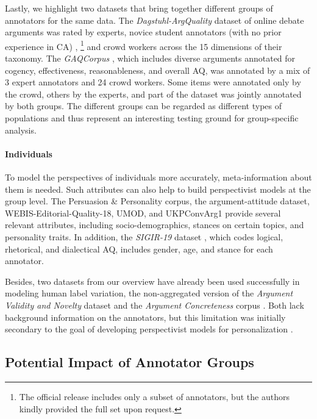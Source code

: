 Lastly, we highlight two datasets that bring together different groups of annotators for the same data. The \textit{Dagstuhl-ArgQuality} dataset \cite{wachsmuth-etal-2017-computational} of online debate arguments was rated by experts, novice student annotators (with no prior experience in CA) \cite{mirzakhmedova2024reliable},%
\footnote{The official release includes only a subset of annotators, but the authors kindly provided the full set upon request.} 
and crowd workers \cite{wachsmuth-etal-2017-argumentation} across the 15 dimensions of their taxonomy. The \textit{GAQCorpus} \cite{lauscher-etal-2020-rhetoric}, which includes diverse arguments annotated for cogency, effectiveness, reasonableness, and overall AQ, was annotated by a mix of 3 expert annotators and 24 crowd workers. Some items were annotated only by the crowd, others by the experts, and part of the dataset was jointly annotated by both groups. The different groups can be regarded as different types of populations and thus represent an interesting testing ground for group-specific analysis.

\paragraph{Individuals}

To model the perspectives of individuals more accurately, meta-information about them is needed. Such attributes can also help to build perspectivist models at the group level. The Persuasion \& Personality corpus, the argument-attitude dataset, WEBIS-Editorial-Quality-18, UMOD, and UKPConvArg1 provide several relevant attributes, including socio-demographics, stances on certain topics, and personality traits. In addition, the \textit{SIGIR-19} dataset \cite{potthast2019argument}, which codes logical, rhetorical, and dialectical AQ, includes gender, age, and stance for each annotator.

Besides, two datasets from our overview have already been used successfully in modeling human label variation, the non-aggregated version of the \textit{Argument Validity and Novelty} dataset \cite{heinisch-etal-2023-architectural} and the \textit{Argument Concreteness} corpus \cite{romberg-etal-2022-corpus}. Both lack background information on the annotators, but this limitation was initially secondary to the goal of developing perspectivist models for personalization \cite{heinisch-etal-2023-architectural}.


\subsection{Potential Impact of Annotator Groups}
\label{sec:pilot}

